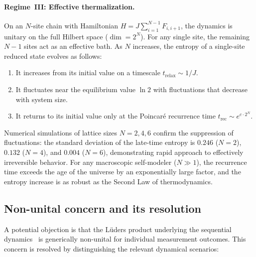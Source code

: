 \paragraph{Regime~III: Effective thermalization.}
On an $N$-site chain with Hamiltonian
$H = J\sum_{i=1}^{N-1} F_{i,i+1}$, the dynamics is unitary on the
full Hilbert space ($\dim = 2^N$).  For any single site, the
remaining $N{-}1$ sites act as an effective bath.  As $N$ increases,
the entropy of a single-site reduced state evolves as follows:
\begin{enumerate}
  \item It increases from its initial value on a timescale
    $t_{\mathrm{relax}} \sim 1/J$.
  \item It fluctuates near the equilibrium value $\ln 2$ with
    fluctuations that decrease with system size.
  \item It returns to its initial value only at the Poincar\'e
    recurrence time $t_{\mathrm{rec}} \sim e^{c \cdot 2^N}$.
\end{enumerate}
Numerical simulations of lattice sizes $N = 2, 4, 6$ confirm the
suppression of fluctuations: the standard deviation of the late-time
entropy is $0.246$ ($N=2$), $0.132$ ($N=4$), and $0.004$ ($N=6$),
demonstrating rapid approach to effectively irreversible behavior.
For any macroscopic self-modeler ($N \gg 1$), the recurrence time
exceeds the age of the universe by an exponentially large factor,
and the entropy increase is as robust as the Second Law of
thermodynamics.

\subsection{Non-unital concern and its
  resolution}\label{sec:non-unital}

A potential objection is that the Lüders product underlying the
sequential dynamics~\cite{Paper5} is generically non-unital for
individual measurement outcomes.  This concern is resolved by
distinguishing the relevant dynamical scenarios:

